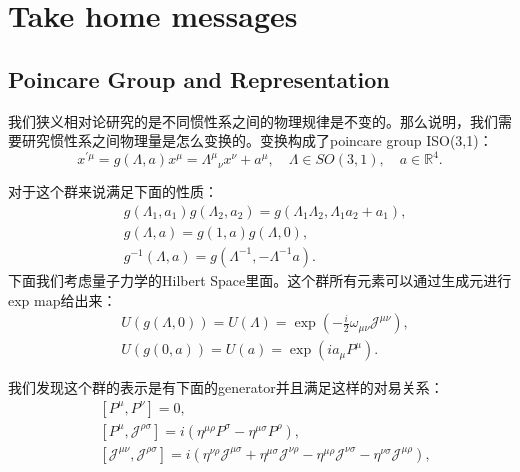 \section{Take home messages}\label{sec:Take home messages} %

\subsection{Poincare Group and Representation}

我们狭义相对论研究的是不同惯性系之间的物理规律是不变的。那么说明，我们需要研究惯性系之间物理量是怎么变换的。变换构成了poincare group ISO(3,1)：
\begin{equation}
  x^{\prime\mu} = g(\Lambda, a) x^\mu =\Lambda^\mu{}_{\nu}x^\nu+a^\mu,\quad\Lambda\in SO(3,1),\quad a\in\mathbb{R}^4. 
  \label{eq:poincaregroup}
\end{equation}

对于这个群来说满足下面的性质：
\begin{equation}
  \begin{aligned}&g(\Lambda_1,a_1)g(\Lambda_2,a_2)=g(\Lambda_1\Lambda_2,\Lambda_1a_2+a_1),\\&g(\Lambda,a)=g(1,a)g(\Lambda,0),\\&g^{-1}(\Lambda,a)=g(\Lambda^{-1},-\Lambda^{-1}a).\end{aligned}
  \label{eq:poincareproperty}
\end{equation}
下面我们考虑量子力学的Hilbert Space里面。这个群所有元素可以通过生成元进行exp map给出来：
\begin{equation}
  \begin{aligned}
  &U(g(\Lambda,0)) = U(\Lambda)=\exp(-\frac{i}{2}\omega_{\mu\nu}\mathcal{J}^{\mu\nu}),\\&U(g(0,a)) = U(a)=\exp(ia_\mu P^\mu).
  \end{aligned}
  \label{eq:groupele}
\end{equation}

我们发现这个群的表示是有下面的generator并且满足这样的对易关系：
\begin{equation}
  \begin{aligned}&[P^\mu,P^\nu]=0,\\&[P^\mu,\mathcal{J}^{\rho\sigma}]=i(\eta^{\mu\rho}P^\sigma-\eta^{\mu\sigma}P^\rho),\\&[\mathcal{J}^{\mu\nu},\mathcal{J}^{\rho\sigma}]=i(\eta^{\nu\rho}\mathcal{J}^{\mu\sigma}+\eta^{\mu\sigma}\mathcal{J}^{\nu\rho}-\eta^{\mu\rho}\mathcal{J}^{\nu\sigma}-\eta^{\nu\sigma}\mathcal{J}^{\mu\rho}),\end{aligned}
  \label{eq:generator}
\end{equation}

